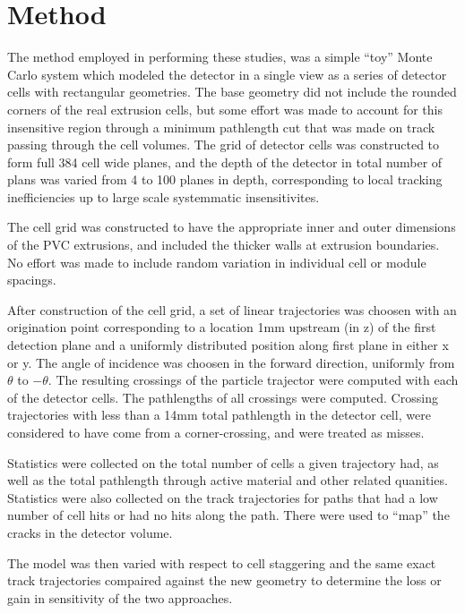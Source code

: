 \section{Method}

The method employed in performing these studies, was a simple ``toy'' Monte Carlo system which modeled the \nova detector in a single view as a series of detector cells with rectangular geometries.  The base geometry did not include the rounded corners of the real \nova extrusion cells, but some effort was made to account for this insensitive region through a minimum pathlength cut that was made on track passing through the cell volumes.  The grid of detector cells was constructed to form full 384 cell wide planes, and the depth of the detector in total number of plans was varied from 4 to 100 planes in depth, corresponding to local tracking inefficiencies up to large scale systemmatic insensitivites.

The cell grid was constructed to have the appropriate inner and outer dimensions of the PVC extrusions, and included the thicker walls at extrusion boundaries.  No effort was made to include random variation in individual cell or module spacings.

After construction of the cell grid, a set of linear trajectories was choosen with an origination point corresponding to a location 1mm upstream (in z) of the first detection plane and a uniformly distributed position along first plane in either x or y.  The angle of incidence was choosen in the forward direction,  uniformly from $\theta$ to $-\theta$.  The resulting crossings of the particle trajector were computed with each of the detector cells.  The pathlengths of all crossings were computed.  Crossing trajectories with less than a 14mm total pathlength in the detector cell, were considered to have come from a corner-crossing, and were treated as misses.

Statistics were collected on the total number of cells a given trajectory had, as well as the total pathlength through active material and other related quanities.  Statistics were also collected on the track trajectories for paths that had a low number of cell hits or had no hits along the path.  There were used to ``map'' the cracks in the detector volume.

The model was then varied with respect to cell staggering and the same exact track trajectories compaired against the new geometry to determine the loss or gain in sensitivity of the two approaches.

